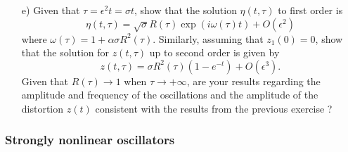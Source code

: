 \begin{problem}
\begin{enumerate}
  \item[e)] Given that $\tau = \epsilon^2 t = \sigma t$, show that the solution $\eta(t, \tau)$ to first order is
    \[
    \eta(t, \tau) = \sqrt{\sigma} R(\tau) \exp \left( i\omega(\tau)t \right) + O(\epsilon^2)
    \]
    where $\omega(\tau) = 1 + \alpha \sigma R^2(\tau)$.
    Similarly, assuming that $z_1(0) = 0$, show that the solution for $z(t, \tau)$ up to second order is given by
    \[
    z(t, \tau) = \sigma R^2(\tau) \left( 1 - e^{-t} \right) + O(\epsilon^3).
    \]
    Given that $R(\tau) \to 1$ when $\tau \to +\infty$, are your results regarding the amplitude and frequency of the oscillations and the amplitude of the distortion $z(t)$ consistent with the results from the previous exercise ?
  \end{enumerate}
  
\end{problem}

\subsubsection*{Strongly nonlinear oscillators}



